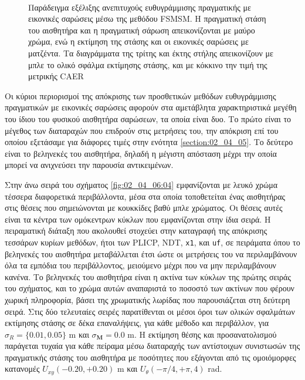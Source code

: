 \begin{figure}
  \begin{subfigure}{\linewidth}\centering
      
    \end{subfigure}\vspace{1cm}\\
    \begin{subfigure}{\linewidth}
      
    \end{subfigure}
  \vspace{0.5cm}
  \caption{\small Παράδειγμα εξέλιξης ανεπιτυχούς ευθυγράμμισης πραγματικής με
           εικονικές σαρώσεις μέσω της μεθόδου FSMSM. Η πραγματική στάση του
           αισθητήρα και η πραγματική σάρωση απεικονίζονται με μαύρο χρώμα, ενώ
           η εκτίμηση της στάσης και οι εικονικές σαρώσεις με ματζέντα. Τα
           διαγράμματα της τρίτης και έκτης στήλης απεικονίζουν με μπλε το
           ολικό σφάλμα εκτίμησης στάσης, και με κόκκινο την τιμή της μετρικής
           CAER}
  \label{fig:02_04_06:03}
\end{figure}

Οι κύριοι περιορισμοί της απόκρισης των προσθετικών μεθόδων ευθυγράμμισης
πραγματικών με εικονικές σαρώσεις αφορούν στα αμετάβλητα χαρακτηριστικά μεγέθη
του ίδιου του φυσικού αισθητήρα σαρώσεων, τα οποία είναι δυο. Το πρώτο είναι το
μέγεθος των διαταραχών που επιδρούν στις μετρήσεις του, την απόκριση επί του
οποίου εξετάσαμε για διάφορες τιμές στην ενότητα \ref{section:02_04_05}. Το
δεύτερο είναι το βεληνεκές του αισθητήρα, δηλαδή η μέγιστη απόσταση μέχρι την
οποία μπορεί να ανιχνεύσει την παρουσία αντικειμένων.

Στην άνω σειρά του σχήματος \ref{fig:02_04_06:04} εμφανίζονται με λευκό χρώμα
τέσσερα διαφορετικά περιβάλλοντα, μέσα στα οποία τοποθετείται ένας αισθητήρας
στις θέσεις που σημειώνονται με κουκκίδες βαθύ μπλε χρώματος. Οι θέσεις αυτές
είναι τα κέντρα των ομόκεντρων κύκλων που εμφανίζονται στην ίδια σειρά. Η
πειραματική διάταξη που ακολουθεί στοχεύει στην καταγραφή της απόκρισης
τεσσάρων κυρίων μεθόδων, ήτοι των PLICP, NDT, \texttt{x1}, και \texttt{uf}, σε
πειράματα όπου το βεληνεκές του αισθητήρα μεταβάλλεται έτσι ώστε οι μετρήσεις
του να περιλαμβάνουν όλα τα εμπόδια του περιβάλλοντος, μειούμενο μέχρι που να
μην περιλαμβάνουν κανένα. Το βεληνεκές του αισθητήρα είναι η ακτίνα των κύκλων
της πρώτης σειράς του σχήματος, και το χρώμα αυτών αναπαριστά το ποσοστό των
ακτίνων που φέρουν χωρική πληροφορία, βάσει της χρωματικής λωρίδας που
παρουσιάζεται στη δεύτερη σειρά. Στις δύο τελευταίες σειρές παρατίθενται οι
μέσοι όροι των ολικών σφαλμάτων εκτίμησης στάσης σε δέκα επαναλήψεις, για κάθε
μέθοδο και περιβάλλον, για $\sigma_R = \{0.01, 0.05\}$ m και $\sigma_{\bm{M}} =
0.0$ m. Η εκτίμηση θέσης και προσανατολισμού παράγεται τυχαία για κάθε πείραμα
μέσω διαταραχής των αντίστοιχων συνιστωσών της πραγματικής στάσης του αισθητήρα
με ποσότητες που εξάγονται από τις ομοιόμορφες κατανομές $U_{xy}(-0.20, +0.20)$
m και $U_{\theta}(-\pi/4,+\pi,4)$ rad.

